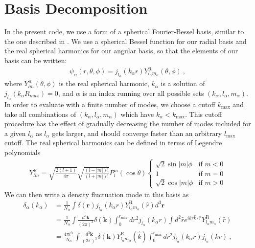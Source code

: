 \documentclass[a4paper,11pt]{article}
\newcommand{\sph}[2]{Y^\text{R}_{l_#1 m_#1}(\hat{#2})}
\newcommand{\jl}[1]{j_{l_#1}}
\newcommand{\dk}{\frac{ d^3 \mathbf{k}}{(2 \pi)^3}}
\begin{document}
\section{Basis Decomposition}
\label{sec:basis}
In the present code, we use a form of a spherical Fourier-Bessel basis, similar to the one described in \cite{spherical_fourier_bessel}. We use a spherical Bessel function for our radial basis and the real spherical harmonics for our angular basis, so that the elements of our basis can be written:
\begin{align} \label{basis_decomp}
\psi_\alpha(r, \theta, \phi) = j_{l_\alpha}(k_\alpha r) Y^\text{R}_{l_\alpha m_\alpha}(\theta, \phi) ~, 
\end{align} 
where $Y^\text{R}_{lm}(\theta, \phi) $ is the real spherical harmonic, $k_\alpha$ is a solution of $j_{l_\alpha}(k_\alpha R_{max})=0$, and $\alpha$ is an index running over all possible sets $(k_\alpha,l_\alpha,m_\alpha)$. In order to evaluate with a finite number of modes, we choose a cutoff $k_{\text{max}}$ and take all combinations of $(k_\alpha,l_\alpha,m_\alpha)$ which have $k_\alpha<k_{\text{max}}$. This cutoff procedure has the effect of gradually decreasing the number of modes included for a given $l_\alpha$ as $l_\alpha$ gets larger, and should converge faster than an arbitrary $l_{\text{max}}$ cutoff. The real spherical harmonics can be defined in terms of Legendre polynomials
\begin{align}\label{real_harmonic2}
Y^\text{R}_{lm} = \sqrt{\frac{2(l+1)}{4\pi}}\sqrt{\frac{(l-|m|)!}{(l+|m|)!}}P^m_l(\cos{\theta})
\begin{cases}
\sqrt{2}\sin{|m|\phi}&\text{if } m<0\\
1& \text{if } m=0\\
\sqrt{2}\cos{|m|\phi}&\text{if } m>0
\end{cases}
\end{align}
We can then write a density fluctuation mode in this basis as
\begin{align}\label{ss_mode}
\delta_\alpha(k_\alpha)& = \frac{1}{N_\alpha}\int \delta(\mathbf{r}) \jl{\alpha}(k_\alpha r) \sph{\alpha}{r} d^3 \mathbf{r}~\\
& = \frac{1}{N_\alpha}\int \dk \delta(\mathbf{k}) \int_0^{r_\text{max}} dr^2 \jl{\alpha}(k_\alpha r) \int d^2 \hat{r} e^{ikr \hat{k} \cdot \hat{r}} \sph{\alpha}{r} \\
& =\frac{4 \pi i^{l_\alpha}}{N_\alpha}\int  \dk \delta(\mathbf{k})  \sph{\alpha}{k}  \int_0^{r_\text{max}} dr^2 \jl{\alpha}(k_\alpha r) \jl{\alpha}(kr)  ~,
\end{align}
\end{document}
